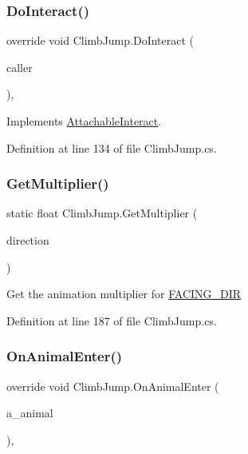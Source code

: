 \subsubsection{\texorpdfstring{Do\+Interact()}{DoInteract()}}
{\footnotesize\ttfamily override void Climb\+Jump.\+Do\+Interact (\begin{DoxyParamCaption}\item[{\mbox{\hyperlink{class_animal}{Animal}}}]{caller }\end{DoxyParamCaption})\hspace{0.3cm}{\ttfamily [protected]}, {\ttfamily [virtual]}}



Implements \mbox{\hyperlink{class_attachable_interact_a9b07a54f1dbb96777c4bd287dfe438e3}{Attachable\+Interact}}.



Definition at line 134 of file Climb\+Jump.\+cs.

\mbox{\label{class_climb_jump_a3a61d393fe89a5a9062af8d33e1881d7}} 
\subsubsection{\texorpdfstring{Get\+Multiplier()}{GetMultiplier()}}
{\footnotesize\ttfamily static float Climb\+Jump.\+Get\+Multiplier (\begin{DoxyParamCaption}\item[{\mbox{\hyperlink{_animal_8cs_a57d10208ebba781ae206546ada2002b6}{F\+A\+C\+I\+N\+G\+\_\+\+D\+IR}}}]{direction }\end{DoxyParamCaption})\hspace{0.3cm}{\ttfamily [static]}}



Get the animation multiplier for \mbox{\hyperlink{_animal_8cs_a57d10208ebba781ae206546ada2002b6}{F\+A\+C\+I\+N\+G\+\_\+\+D\+IR}} 



Definition at line 187 of file Climb\+Jump.\+cs.

\mbox{\label{class_climb_jump_a66b008bb35c83a5cf66d7f70ca0c4acf}} 
\subsubsection{\texorpdfstring{On\+Animal\+Enter()}{OnAnimalEnter()}}
{\footnotesize\ttfamily override void Climb\+Jump.\+On\+Animal\+Enter (\begin{DoxyParamCaption}\item[{\mbox{\hyperlink{class_animal}{Animal}}}]{a\+\_\+animal }\end{DoxyParamCaption})\hspace{0.3cm}{\ttfamily [protected]}, {\ttfamily [virtual]}}



